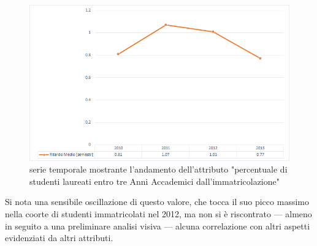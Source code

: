     \begin{figure}
        \centering
        \caption{serie temporale mostrante l'andamento dell'attributo "percentuale di studenti laureati entro tre Anni Accademici dall'immatricolazione"}
        \label{laureati}
        \includegraphics[scale=0.55]{../visual/stud_3.png}
    \end{figure}

    Si nota una sensibile oscillazione di questo valore, che tocca il suo picco massimo nella coorte di studenti immatricolati nel 2012, ma non si è riscontrato --- almeno in seguito a una preliminare analisi visiva --- alcuna correlazione con altri aspetti evidenziati da altri attributi.
